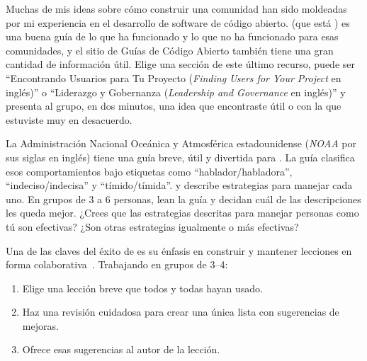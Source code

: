 
Muchas de mis ideas sobre cómo construir una comunidad
han sido moldeadas por mi experiencia en el desarrollo de software de código abierto.
\cite{Foge2005} (que está )
es una buena guía de lo que ha funcionado y lo que no ha funcionado para esas comunidades,
y el  {sitio de Guías de Código Abierto}
también tiene una gran cantidad de información útil.
Elige una sección de este último recurso, puede ser  ``Encontrando Usuarios para Tu Proyecto (\emph{Finding Users for Your Project} en inglés)''
o ``Liderazgo y Gobernanza (\emph{Leadership and Governance} en inglés)''
y presenta al grupo, en dos minutos, una idea
que encontraste útil o con la que estuviste muy en desacuerdo.


La Administración Nacional Oceánica y Atmosférica estadounidense (\emph{NOAA} por sus siglas en inglés) tiene una guía breve, útil y divertida para
.
La guía clasifica esos comportamientos bajo etiquetas como ``hablador/habladora'', ``indeciso/indecisa'' y ``tímido/tímida''.
y describe estrategias para manejar cada uno.
En grupos de 3 a 6 personas,
lean la guía y decidan cuál de las descripciones les queda mejor.
¿Crees que las estrategias descritas para manejar personas como tú son efectivas?
¿Son otras estrategias igualmente o más efectivas?


Una de las claves del éxito de 
es su énfasis en construir y mantener lecciones en forma colaborativa~\cite{Wils2016,Deve2018}.
Trabajando en grupos de 3--4:

\begin{enumerate}

\item
  Elige una lección breve que todos y todas hayan usado.

\item
  Haz una revisión cuidadosa para crear una única lista con sugerencias de mejoras.

\item
  Ofrece esas sugerencias al autor de la lección.

\end{enumerate}

